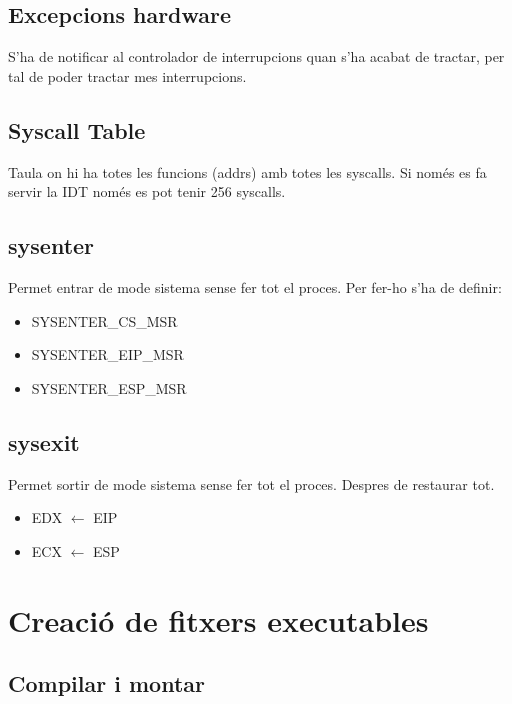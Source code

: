 \documentclass{article}
\begin{document}
    \subsection{Excepcions hardware}

        S'ha de notificar al controlador de interrupcions quan s'ha acabat de tractar, per tal de poder tractar mes interrupcions.

    \subsection{Syscall Table}

        Taula on hi ha totes les funcions (addrs) amb totes les syscalls. Si només es fa servir la IDT només es pot tenir 256 syscalls.

    \subsection{sysenter}

        Permet entrar de mode sistema sense fer tot el proces.
        Per fer-ho s'ha de definir:

         \begin{itemize}
            \item SYSENTER\_CS\_MSR
            \item SYSENTER\_EIP\_MSR
            \item SYSENTER\_ESP\_MSR
        \end{itemize}

    \subsection{sysexit}
        Permet sortir de mode sistema sense fer tot el proces.
        Despres de restaurar tot.
        \begin{itemize}
            \item EDX $\leftarrow$ EIP
            \item ECX $\leftarrow$ ESP
        \end{itemize}

    \pagebreak

    \section{Creació de fitxers executables}

    \subsection{Compilar i montar}
\end{document}
